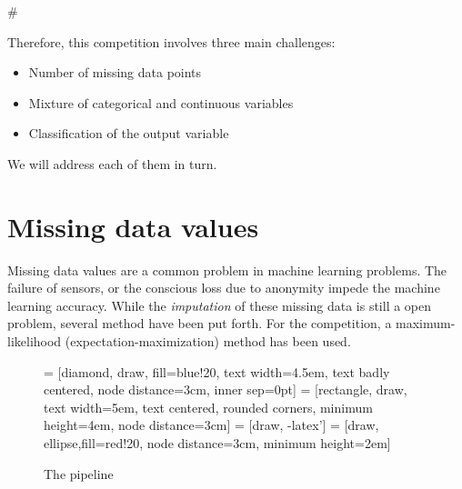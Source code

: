 #\documentclass{article}
\begin{document}
Therefore, this competition involves three main challenges:
\begin{itemize}
\item Number of missing data points
\item Mixture of categorical and continuous variables
\item Classification of the output variable
\end{itemize}

We will address each of them in turn.

\section{Missing data values}

Missing data values are a common problem in machine learning
problems. The failure of sensors, or the conscious loss due to
anonymity impede the machine learning accuracy. While the
\emph{imputation} of these missing data is still a open problem,
several method have been put forth. For the competition, a
maximum-likelihood (expectation-maximization) method has been used.

\begin{figure}[h]
  \centering
 = [diamond, draw, fill=blue!20, 
    text width=4.5em, text badly centered, node distance=3cm, inner sep=0pt]
 = [rectangle, draw, 
    text width=5em, text centered, rounded corners, minimum
    height=4em, node distance=3cm]
 = [draw, -latex']
 = [draw, ellipse,fill=red!20, node distance=3cm,
    minimum height=2em]
  \caption{The pipeline}
  \label{fig:pipeline}
\end{figure}
\end{document}
